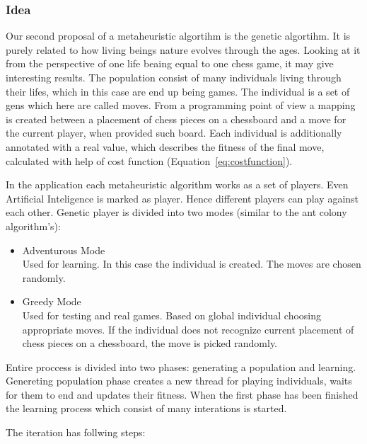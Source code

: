 \documentclass[pdftex]{article}
\begin{document}
\subsubsection{Idea}
Our second proposal of a metaheuristic algortihm is the genetic algortihm. It is purely related to how living beings nature evolves through the ages. Looking at it from the perspective of one life beaing equal to one chess game, it may give interesting results. The population consist of many individuals living through their lifes, which in this case are end up being games. The individual is a set of gens which here are called moves. From a programming point of view a mapping is created between a placement of chess pieces on a chessboard and a move for the current player, when provided such board. Each individual is additionally annotated with a real value, which describes the fitness of the final move, calculated with help of cost function (Equation~\ref{eq:costfunction}).

In the application each metaheuristic algorithm works as a set of players. Even Artificial Inteligence is marked as player. Hence different players can play against each other. Genetic player is divided into two modes (similar to the ant colony algorithm's):
\begin{itemize}
 	\item Adventurous Mode \hfill \\
		Used for learning. In this case the individual is created. The moves are chosen randomly.

	\item Greedy Mode \hfill \\
		Used for testing and real games. Based on global individual choosing appropriate moves. If the individual does not recognize current placement of chess pieces on a chessboard, the move is picked randomly.
\end{itemize}

Entire proccess is divided into two phases: generating a population and learning.
Genereting population phase creates a new thread for playing individuals, waits for them to end and updates their fitness.
When the first phase has been finished the learning process which consist of many interations is started.

The iteration has follwing steps:
\end{document}

